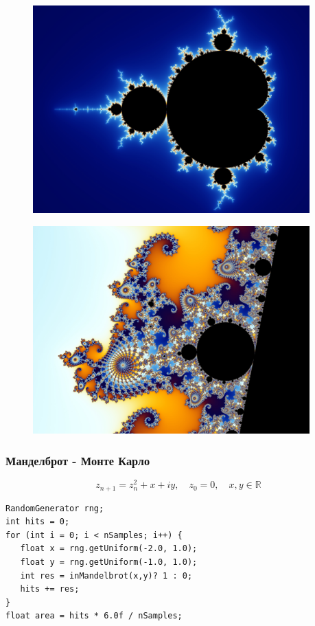 
\begin{frame}
  \begin{figure}[t]
    \includegraphics[height=8.0cm]{Mandel_zoom_00_mandelbrot_set.jpg}
  \end{figure}
\end{frame}
\begin{frame}
  \begin{figure}[t]
    \includegraphics[height=8.0cm]{Mandel_zoom_03_seehorse.jpg}
  \end{figure}
\end{frame}

\begin{frame}[fragile]
  \frametitle{Манделброт - Монте Карло}
  \begin{equation*}
  z_{n+1} = z_n^2 + x + iy, \quad z_0 = 0, \quad x,y \in \mathbb{R} 
  \end{equation*}
  \pause
\begin{lstlisting}
RandomGenerator rng;
int hits = 0;
for (int i = 0; i < nSamples; i++) {
   float x = rng.getUniform(-2.0, 1.0);
   float y = rng.getUniform(-1.0, 1.0);
   int res = inMandelbrot(x,y)? 1 : 0;
   hits += res;
}
float area = hits * 6.0f / nSamples;
\end{lstlisting}
\end{frame}
